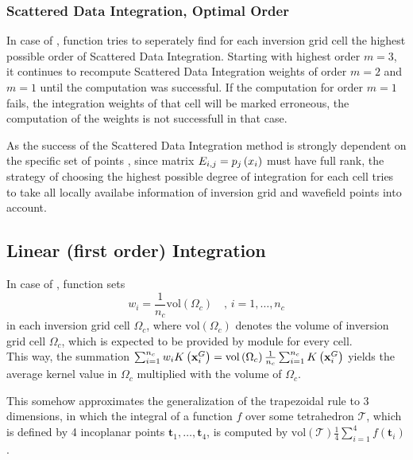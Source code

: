 \subsubsection{Scattered Data Integration, Optimal Order}
%
In case of , function  tries to seperately 
find for each inversion grid cell the highest possible order of Scattered Data Integration. 
Starting with highest order $m=3$, it continues to recompute Scattered Data Integration weights of 
order $m = 2$ and $m = 1$ until the computation was successful. If the computation for order $m=1$ 
fails, the integration weights of that cell will be marked erroneous, the computation of the weights
is not successfull in that case.

As the success of the Scattered Data Integration method is strongly dependent on the specific set of 
points \wpS, since matrix $E_{i,j} = p_j\left( x_i \right)$ must have full rank, the strategy of choosing 
the highest possible degree of integration for each cell tries to take all locally availabe information 
of inversion grid and wavefield points into account.
%
\subsection{Linear (first order) Integration} \label{programs_scripts,sec:fmod_intw,sec:linear}
%
In case of , function  sets 
\[w_i = \frac{1}{n_c}\mathrm{vol}\left(\Omega_c\right) \quad ,\, i=1,\dots,n_c\]
in each inversion grid cell $\Omega_c$, where $\mathrm{vol}\left(\Omega_c\right)$ denotes the 
volume of inversion grid cell $\Omega_c$, which is expected to be provided by module 
for every cell.\\
This way, the summation $\sum_{i=1}^{n_c} w_iK\left( \mathbf{x}_i^G \right) = 
\mathrm{vol}\left(\Omega_c\right)\frac{1}{n_c} \sum_{i=1}^{n_c} K\left( \mathbf{x}_i^G \right)$ yields 
the average kernel value in $\Omega_c$ multiplied with the volume of $\Omega_c$.

This somehow approximates the generalization of the trapezoidal rule to 3 dimensions, in which the 
integral of a function $f$ over some tetrahedron $\mathcal{T}$, which is defined by 4 incoplanar points 
$\mathbf{t}_1,\dots,\mathbf{t}_4$, is computed by $\mathrm{vol}\left(\mathcal{T}\right)\frac{1}{4} 
\sum_{i=1}^4 f(\mathbf{t}_i)$. 
%

